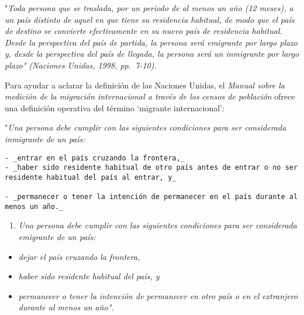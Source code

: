 \documentclass[
]{book}
\providecommand{\tightlist}{%
  \setlength{\itemsep}{0pt}\setlength{\parskip}{0pt}}
\begin{document}
"\emph{Toda persona que se traslada, por un periodo de al menos un año (12 meses), a un país distinto de aquel en que tiene su residencia habitual, de modo que el país de destino se convierte efectivamente en su nuevo país de residencia habitual. Desde la perspectiva del país de partida, la persona será emigrante por largo plazo y, desde la perspectiva del país de llegada, la persona será un inmigrante por largo plazo" (Naciones Unidas, 1998, pp.~7-10).}

Para ayudar a aclarar la definición de las Naciones Unidas, el \emph{Manual sobre la medición de la migración internacional a través de los censos de población} ofrece una definición operativa del término `migrante internacional':

"\emph{Una persona debe cumplir con las siguientes condiciones para ser considerada inmigrante de un país:}

\begin{verbatim}
- _entrar en el país cruzando la frontera,_
- _haber sido residente habitual de otro país antes de entrar o no ser residente habitual del país al entrar, y_

- _permanecer o tener la intención de permanecer en el país durante al menos un año._
\end{verbatim}

\begin{enumerate}
\def\labelenumi{\arabic{enumi}.}
\tightlist
\item
  \emph{Una persona debe cumplir con las siguientes condiciones para ser considerada emigrante de un país:}
\end{enumerate}

\begin{itemize}
\tightlist
\item
  \emph{dejar el país cruzando la frontera,}
\item
  \emph{haber sido residente habitual del país, y}
\item
  \emph{permanecer o tener la intención de permanecer en otro país o en el extranjero durante al menos un año".}
\end{itemize}
\end{document}
